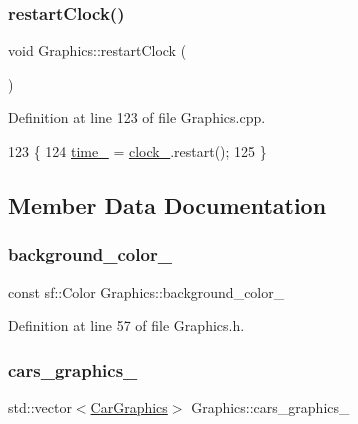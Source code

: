 \mbox{\label{classGraphics_abb78da7bc406f5c9518f7fd3f20b42f8}} 
\subsubsection{\texorpdfstring{restart\+Clock()}{restartClock()}}
{\footnotesize\ttfamily void Graphics\+::restart\+Clock (\begin{DoxyParamCaption}{ }\end{DoxyParamCaption})}



Definition at line 123 of file Graphics.\+cpp.


\begin{DoxyCode}
123                             \{
124     \hyperlink{classGraphics_ab2983b7d90351c0f7b824ac6f887fd6d}{time\_} = \hyperlink{classGraphics_ad9850d50fe5792666c8aea88f39ba99c}{clock\_}.restart();
125 \}
\end{DoxyCode}


\subsection{Member Data Documentation}
\mbox{\label{classGraphics_a44d7a76a58e03b8ad3f025123894c526}} 
\subsubsection{\texorpdfstring{background\+\_\+color\+\_\+}{background\_color\_}}
{\footnotesize\ttfamily const sf\+::\+Color Graphics\+::background\+\_\+color\+\_\+\hspace{0.3cm}{\ttfamily [private]}}



Definition at line 57 of file Graphics.\+h.

\mbox{\label{classGraphics_a8be356ffe3ee47f915027361b6ae34ab}} 
\subsubsection{\texorpdfstring{cars\+\_\+graphics\+\_\+}{cars\_graphics\_}}
{\footnotesize\ttfamily std\+::vector$<$\hyperlink{classCarGraphics}{Car\+Graphics}$>$ Graphics\+::cars\+\_\+graphics\+\_\+\hspace{0.3cm}{\ttfamily [private]}}



